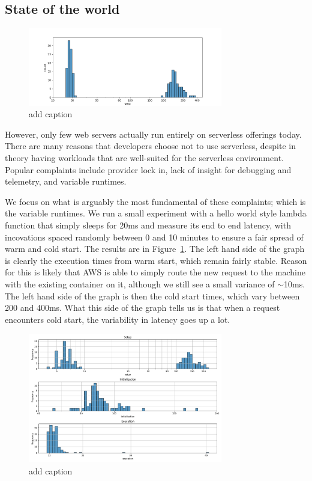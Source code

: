 \subsection{State of the world}


\begin{figure}[t!]
    \centering
      \includegraphics[width=8.5cm]{img/lambda_total_durations.png}
      \caption{ add caption }
    \label{fig:lambda-total-durations}
\end{figure}

However, only few web servers actually run entirely on serverless offerings
today. There are many reasons that developers choose not to use serverless,
despite in theory having workloads that are well-suited for the serverless
environment.
Popular complaints include provider lock in, lack of insight for debugging and
telemetry, and variable runtimes.


We focus on what is arguably the most fundamental of these complaints; which is
the variable runtimes. We run a small experiment with a hello world style lambda
function that simply sleeps for 20ms and measure its end to end latency, with
incovations spaced randomly between 0 and 10 minutes to ensure a fair spread of
warm and cold start. The results are in Figure~\ref{fig:lambda-total-durations}.
The left hand side of the graph is clearly the execution times from warm start,
which remain fairly stable. Reason for this is likely that AWS is able to simply
route the new request to the machine with the existing container on it, although
we still see a small variance of $\sim$10ms. The left hand side of the graph is then
the cold start times, which vary between 200 and 400ms. What this side of the
graph tells us is that when a request encounters cold start, the variability in
latency goes up a lot. 

\begin{figure}[t!]
  \centering
    \includegraphics[width=8.5cm]{img/lambda_duration_breakdown.png}
    \caption{ add caption }
  \label{fig:lambda-durations-breakdown}
\end{figure}

